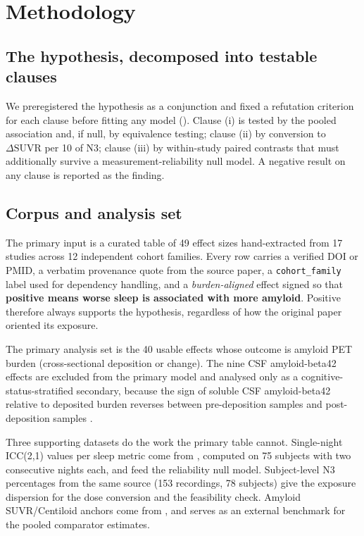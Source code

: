 \section{Methodology}
\label{sec:method}

\subsection{The hypothesis, decomposed into testable clauses}
\label{sec:clauses}

We preregistered the hypothesis as a conjunction and fixed a refutation criterion for each
clause before fitting any model (). Clause (i) is tested by the pooled
association and, if null, by equivalence testing; clause (ii) by conversion to
$\Delta\mathrm{SUVR}$ per 10 \pp of N3; clause (iii) by within-study paired contrasts that must
additionally survive a measurement-reliability null model. A negative result on any clause is
reported as the finding.



\subsection{Corpus and analysis set}
\label{sec:data}

The primary input is a curated table of 49 effect sizes hand-extracted from 17 studies across 12
independent cohort families. Every row carries a verified DOI or PMID, a verbatim provenance
quote from the source paper, a \texttt{cohort\_family} label used for dependency handling, and a
\emph{burden-aligned} effect signed so that \textbf{positive means worse sleep is associated
with more amyloid}. Positive therefore always supports the hypothesis, regardless of how the
original paper oriented its exposure.

The primary analysis set is the 40 usable effects whose outcome is amyloid PET burden
(cross-sectional deposition or change). The nine CSF amyloid-beta42 effects are excluded from
the primary model and analysed only as a cognitive-status-stratified secondary, because the sign
of soluble CSF amyloid-beta42 relative to deposited burden reverses between pre-deposition
samples \citep{varga2016} and post-deposition samples \citep{liguori2020}.

Three supporting datasets do the work the primary table cannot. Single-night ICC(2,1) values per
sleep metric come from \sleepedf \citep{kemp2000}, computed on 75 subjects with two consecutive
nights each, and feed the reliability null model. Subject-level N3 percentages from the same
source (153 recordings, 78 subjects) give the exposure dispersion for the dose conversion and
the feasibility check. Amyloid SUVR/Centiloid anchors come from \citet{jack2017}, and
\citet{chen2025} serves as an external benchmark for the pooled comparator estimates.

